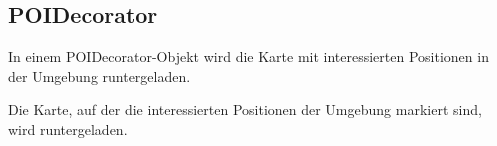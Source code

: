 \documentclass[entwurf.tex]{subfiles}
\begin{document}
		\subsection{POIDecorator}
			In einem POIDecorator-Objekt wird die Karte mit interessierten Positionen in
			der Umgebung runtergeladen.
				\begin{description}
				Die Karte, auf der die interessierten Positionen der Umgebung markiert sind,
				wird runtergeladen.
				\end{description}
\end{document}
